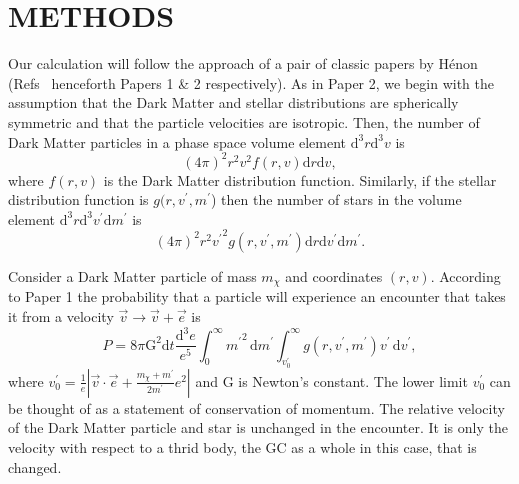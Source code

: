 \documentclass[aps,floatfix,prd,showpacs]{revtex4}
\newcommand{\diff}{\mathrm{d}}
\newcommand{\vp}{v^\prime}
\newcommand{\mpr}{m^\prime}
\newcommand{\G}{\text{G}}
\newcommand{\mx}{m_\chi}
\begin{document}
\section{METHODS}
\label{section:methods3}


Our calculation will follow the approach of a pair of classic papers by H\'{e}non (Refs~\cite{HenonA,HenonB} henceforth Papers 1 \& 2 respectively). As in Paper 2, we begin with the assumption that the Dark Matter and stellar distributions are spherically symmetric and that the particle velocities are isotropic. Then, the number of Dark Matter particles in a phase space volume element $\diff^3r\diff^3v$ is
%
\begin{equation}
(4\pi)^2r^2v^2f(r,v)\diff r\diff v,
\end{equation}
%
%
where $f(r,v)$ is the Dark Matter distribution function. Similarly, if the stellar distribution function is $g(r,\vp,\mpr$) then the number of stars in the volume element $\diff^3r\diff^3\vp \diff \mpr$ is
%
\begin{equation}
(4\pi)^2r^2{\vp}^2g(r,\vp,\mpr)\diff r\diff \vp \diff \mpr.
\end{equation}
%
%

Consider a Dark Matter particle of mass $\mx$ and coordinates $(r,v)$. According to Paper 1 the probability that a particle will experience an encounter that takes it from a velocity $\vec{v} \rightarrow \vec{v} + \vec{e}$ is
%
\begin{equation}
P = 8\pi \G^2\diff t\frac{\diff^3e}{e^5}\int^\infty_0 {\mpr}^2\,\diff \mpr\int^\infty_{\vp_0}g(r,\vp,\mpr)\vp\,\diff \vp, 
\end{equation}
%
%
where $\vp_0 = \frac{1}{e}|\vec{v}\cdot\vec{e} + \frac{\mx+\mpr}{2\mpr}e^2|$ and G is Newton's constant. The lower limit $\vp_0$ can be thought of as a statement of conservation of momentum.  The relative velocity of the Dark Matter particle and star is unchanged in the encounter.  It is only the velocity with respect to a thrid body, the GC as a whole in this case, that is changed.  
\end{document}
